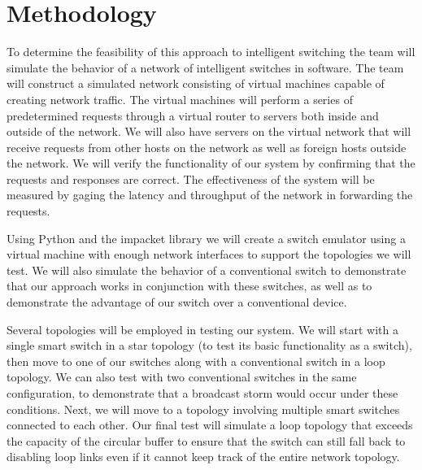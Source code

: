 \section{Methodology}
\label{sec:methodology}
	To determine the feasibility of this approach to intelligent switching the team will simulate the behavior of a network of intelligent switches in software.
	The team will construct a simulated network consisting of virtual machines capable of creating network traffic.
	The virtual machines will perform a series of predetermined requests through a virtual router to servers both inside and outside of the network.
	We will also have servers on the virtual network that will receive requests from other hosts on the network as well as foreign hosts outside the network.
	We will verify the functionality of our system by confirming that the requests and responses are correct.
	The effectiveness of the system will be measured by gaging the latency and throughput of the network in forwarding the requests.
	
	Using Python and the impacket library we will create a switch emulator using a virtual machine with enough network interfaces to support the topologies we will test.
	We will also simulate the behavior of a conventional switch to demonstrate that our approach works in conjunction with these switches, as well as to demonstrate the advantage of our switch over a conventional device.
	
	Several topologies will be employed in testing our system.
	We will start with a single smart switch in a star topology (to test its basic functionality as a switch), then move to one of our switches along with a conventional switch in a loop topology.
	We can also test with two conventional switches in the same configuration, to demonstrate that a broadcast storm would occur under these conditions.
	Next, we will move to a topology involving multiple smart switches connected to each other.
	Our final test will simulate a loop topology that exceeds the capacity of the circular buffer to ensure that the switch can still fall back to disabling loop links even if it cannot keep track of the entire network topology.

